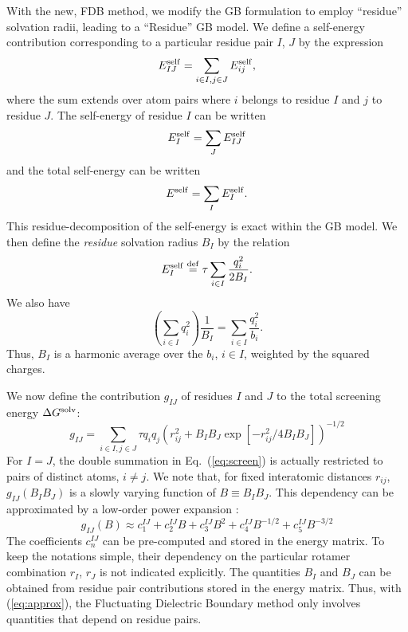 \documentclass[a4paper,12pt]{article}
\begin{document}
With the new, FDB method, we modify the GB formulation to employ ``residue'' solvation radii, leading to a ``Residue''
GB model. We define a self-energy contribution corresponding to a particular residue pair $I$, $J$ by the expression 
\begin{equation} \label{eq:selfRR}
E^{\rm self}_{IJ} = \sum_{i \in I, j \in J} E_{ij}^{\rm self},
\end{equation}
where the sum extends over atom pairs where $i$ belongs to residue $I$ and $j$ to residue $J$. The self-energy of residue 
$I$ can be written 
\begin{equation} \label{eq:self1}
E^{\rm self}_I = \sum_J E^{\rm self}_{IJ}
\end{equation}
and the total self-energy can be written 
\begin{equation} \label{eq:self2}
E^{\rm self} = \sum_I E^{\rm self}_I.
\end{equation}
This residue-decomposition of the self-energy is exact within the GB model. We then define the {\it residue} solvation
radius $B_I$ by the relation
\begin{equation} \label{eq:defB}
E^{\rm self}_I \stackrel{\rm def}{=} \tau \sum_{i \in I} \frac{q_i^2}{2 B_I}.
\end{equation}
We also have
\begin{equation}
\left( \sum_{i \in I} q_i^2 \right) \frac{1}{B_I} = \sum_{i \in I} \frac{q_i^2}{b_i}.
\end{equation}
Thus, $B_I$ is a harmonic average over the $b_i$, $i \in I$, weighted by the squared charges.

We now define the contribution $g_{IJ}$ of residues $I$ and $J$ to the total screening energy $\Delta G^{\rm solv}$:
\begin{equation} 
g_{IJ} = \sum_{i \in I, j \in J} \tau q_i q_j \left( r_{ij}^2 + B_I B_J \exp[-r_{ij}^2/4 B_I B_J] \right)^{-1/2}
\label{eq:screen}
\end{equation}
For $I=J$, the double summation in Eq.\ (\ref{eq:screen}) is actually restricted to pairs of distinct atoms, $i \neq j$.
We note that, for fixed interatomic distances $r_{ij}$, $g_{IJ}(B_I B_J)$ is a slowly varying function of $B \equiv B_I B_J$.
This dependency can be approximated by a low-order power expansion \cite{Archontis05b}:
\begin{equation} 
g_{IJ}(B) \approx c_1^{IJ} + c_2^{IJ} B + c_3^{IJ} B^2 + c_4^{IJ} B^{-1/2} + c_5^{IJ} B^{-3/2}  \label{eq:approx}
\end{equation}
The coefficients $c_n^{IJ}$ can be pre-computed and stored in the energy matrix. To keep the notations simple, their
dependency on the particular rotamer combination $r_I$, $r_J$ is not indicated explicitly. The quantities $B_I$ and
$B_J$ can be obtained from residue pair contributions stored in the energy matrix. Thus, with (\ref{eq:approx}), the
Fluctuating Dielectric Boundary method only involves quantities that depend on residue pairs. 
\end{document}
